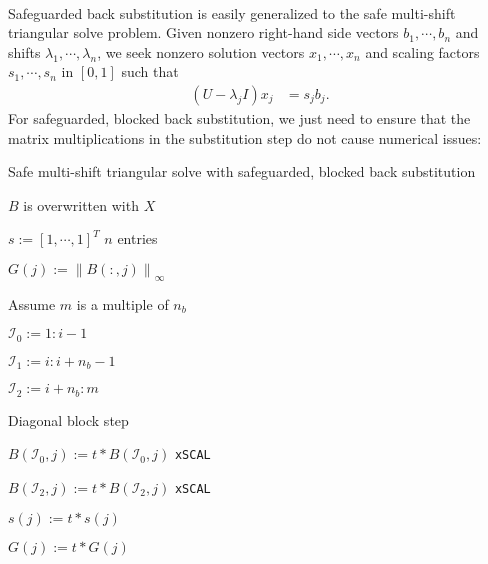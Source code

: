 \documentclass{article}
\begin{document}
\paragraph{} Safeguarded back substitution is easily generalized to
the safe multi-shift triangular solve problem. Given nonzero
right-hand side vectors \(b_1,\cdots,b_n\) and shifts
\(\lambda_1,\cdots,\lambda_n\), we seek nonzero solution vectors
\(x_1,\cdots,x_n\) and scaling factors \(s_1,\cdots,s_n\) in
\(\left[0,1\right]\) such that
\begin{align}
  \left( U - \lambda_j I\right) x_j &= s_j b_j.
\end{align}
For safeguarded, blocked back substitution, we just need to ensure
that the matrix multiplications in the substitution step do not cause
numerical issues:
\begin{algorithm}[H]
  \caption{Safe multi-shift triangular solve with safeguarded, blocked back substitution }
  \label{algorithm:safe multi-shift trsm}
  \begin{algorithmic}
    \Comment \(B\) is overwritten with \(X\)

    \State \(s := \left[1, \cdots, 1 \right]^T\) \Comment \(n\) entries


    \State \( G(j) := \left\lVert B(:,j) \right\rVert_\infty\)

    \EndFor

     \Comment Assume \(m\) is a multiple of
    \(n_b\)

    \State \( \mathcal{I}_0 := 1:i-1 \)

    \State \( \mathcal{I}_1 := i:i+n_b-1\)

    \State \( \mathcal{I}_2 := i+n_b:m\)
    

    \State {} 
    \Comment Diagonal block step


    \State \(B(\mathcal{I}_0,j) := t*B(\mathcal{I}_0,j)\) \Comment \texttt{xSCAL}

    \State \(B(\mathcal{I}_2,j) := t*B(\mathcal{I}_2,j)\) \Comment \texttt{xSCAL}

    \State \(s(j) := t * s(j)\)

    \State \(G(j) := t * G(j)\)

    \EndIf


\end{algorithmic}
\end{algorithm}
\end{document}
